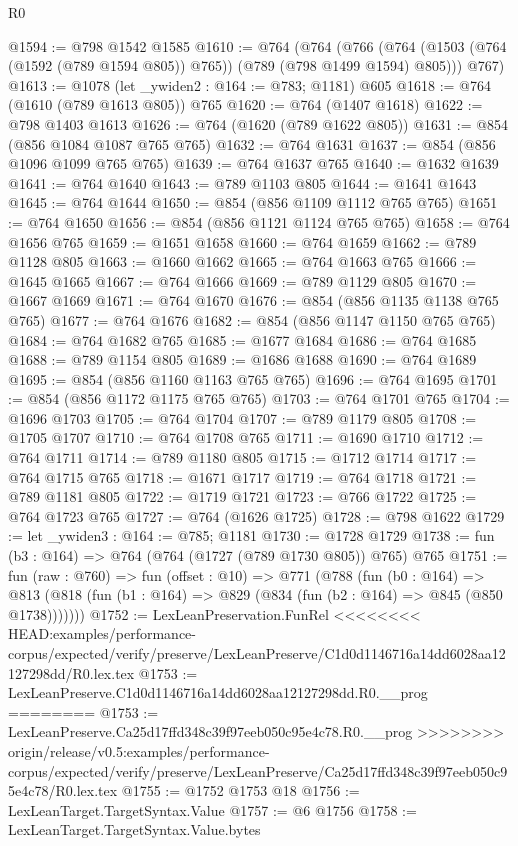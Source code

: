 \begin{lexlean}{R0}
\begin{coremodule}
{{{{{@1594 := @798 @1542 @1585
@1610 := @764
    (@764
      (@766 (@764 (@1503 (@764 (@1592 (@789 @1594 @805)) @765)) (@789 (@798 @1499 @1594) @805)))
      @767)
@1613 := @1078 (let _ywiden2 : @164 := @783; @1181) @605
@1618 := @764 (@1610 (@789 @1613 @805)) @765
@1620 := @764 (@1407 @1618)
@1622 := @798 @1403 @1613
@1626 := @764 (@1620 (@789 @1622 @805))
@1631 := @854 (@856 @1084 @1087 @765 @765)
@1632 := @764 @1631
@1637 := @854 (@856 @1096 @1099 @765 @765)
@1639 := @764 @1637 @765
@1640 := @1632 @1639
@1641 := @764 @1640
@1643 := @789 @1103 @805
@1644 := @1641 @1643
@1645 := @764 @1644
@1650 := @854 (@856 @1109 @1112 @765 @765)
@1651 := @764 @1650
@1656 := @854 (@856 @1121 @1124 @765 @765)
@1658 := @764 @1656 @765
@1659 := @1651 @1658
@1660 := @764 @1659
@1662 := @789 @1128 @805
@1663 := @1660 @1662
@1665 := @764 @1663 @765
@1666 := @1645 @1665
@1667 := @764 @1666
@1669 := @789 @1129 @805
@1670 := @1667 @1669
@1671 := @764 @1670
@1676 := @854 (@856 @1135 @1138 @765 @765)
@1677 := @764 @1676
@1682 := @854 (@856 @1147 @1150 @765 @765)
@1684 := @764 @1682 @765
@1685 := @1677 @1684
@1686 := @764 @1685
@1688 := @789 @1154 @805
@1689 := @1686 @1688
@1690 := @764 @1689
@1695 := @854 (@856 @1160 @1163 @765 @765)
@1696 := @764 @1695
@1701 := @854 (@856 @1172 @1175 @765 @765)
@1703 := @764 @1701 @765
@1704 := @1696 @1703
@1705 := @764 @1704
@1707 := @789 @1179 @805
@1708 := @1705 @1707
@1710 := @764 @1708 @765
@1711 := @1690 @1710
@1712 := @764 @1711
@1714 := @789 @1180 @805
@1715 := @1712 @1714
@1717 := @764 @1715 @765
@1718 := @1671 @1717
@1719 := @764 @1718
@1721 := @789 @1181 @805
@1722 := @1719 @1721
@1723 := @766 @1722
@1725 := @764 @1723 @765
@1727 := @764 (@1626 @1725)
@1728 := @798 @1622
@1729 := let _ywiden3 : @164 := @785; @1181
@1730 := @1728 @1729
@1738 := fun (b3 : @164) => @764 (@764 (@1727 (@789 @1730 @805)) @765) @765
@1751 := fun (raw : @760) =>
  fun (offset : @10) =>
  @771
    (@788
      (fun (b0 : @164) =>
      @813 (@818 (fun (b1 : @164) => @829 (@834 (fun (b2 : @164) => @845 (@850 @1738)))))))
@1752 := LexLeanPreservation.FunRel
<<<<<<<< HEAD:examples/performance-corpus/expected/verify/preserve/LexLeanPreserve/C1d0d1146716a14dd6028aa12127298dd/R0.lex.tex
@1753 := LexLeanPreserve.C1d0d1146716a14dd6028aa12127298dd.R0.__prog
========
@1753 := LexLeanPreserve.Ca25d17ffd348c39f97eeb050c95e4c78.R0.__prog
>>>>>>>> origin/release/v0.5:examples/performance-corpus/expected/verify/preserve/LexLeanPreserve/Ca25d17ffd348c39f97eeb050c95e4c78/R0.lex.tex
@1755 := @1752 @1753 @18
@1756 := LexLeanTarget.TargetSyntax.Value
@1757 := @6 @1756
@1758 := LexLeanTarget.TargetSyntax.Value.bytes
}}}}}
\end{coremodule}
\end{lexlean}
